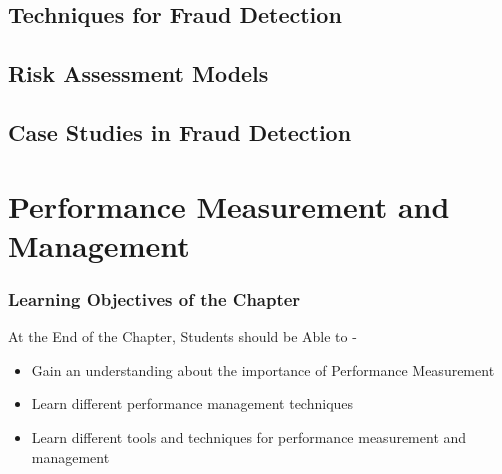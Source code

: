 \documentclass[
  letterpaper,
  DIV=11,
  numbers=noendperiod]{scrreprt}
\begin{document}
\section{Techniques for Fraud
Detection}\label{techniques-for-fraud-detection}

\section{Risk Assessment Models}\label{risk-assessment-models}

\section{Case Studies in Fraud
Detection}\label{case-studies-in-fraud-detection}

\chapter{Performance Measurement and
Management}\label{performance-measurement-and-management}

\subsection*{Learning Objectives of the
Chapter}\label{learning-objectives-of-the-chapter-12}

\begin{tcolorbox}[enhanced jigsaw, arc=.35mm, bottomrule=.15mm, bottomtitle=1mm, breakable, colback=white, colbacktitle=quarto-callout-note-color!10!white, colframe=quarto-callout-note-color-frame, coltitle=black, left=2mm, leftrule=.75mm, opacityback=0, opacitybacktitle=0.6, rightrule=.15mm, title=\textcolor{quarto-callout-note-color}{\faInfo}\hspace{0.5em}{Learning Objectives}, titlerule=0mm, toprule=.15mm, toptitle=1mm]

At the End of the Chapter, Students should be Able to -

\begin{itemize}
\item
  Gain an understanding about the importance of Performance Measurement
\item
  Learn different performance management techniques
\item
  Learn different tools and techniques for performance measurement and
  management
\end{itemize}

\end{tcolorbox}
\end{document}

